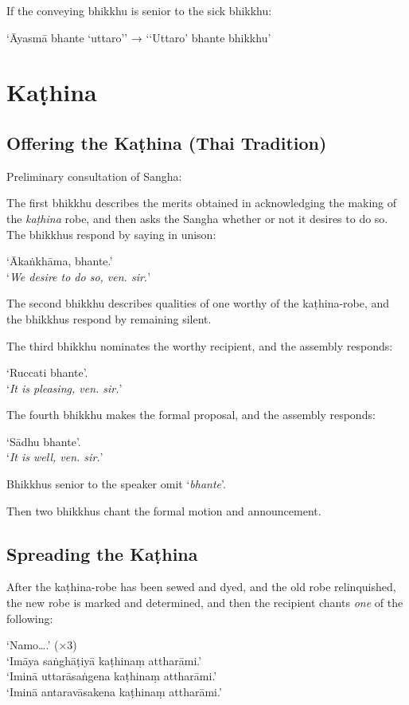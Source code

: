 If the conveying bhikkhu is senior to the sick bhikkhu:

‘Āyasmā bhante ‘uttaro’’ → ‘‘Uttaro’ bhante bhikkhu’


\section{Kaṭhina}

\subsection{Offering the Kaṭhina (Thai Tradition)}

Preliminary consultation of Sangha:

The first bhikkhu describes the merits obtained in acknowledging the making of
the \emph{kaṭhina} robe, and then asks the Sangha whether or not it desires to
do so. The bhikkhus respond by saying in unison:

‘Ākaṅkhāma, bhante.’\\
‘\emph{We desire to do so, ven. sir.}’

The second bhikkhu describes qualities of one worthy of the kaṭhina-robe, and
the bhikkhus respond by remaining silent.

The third bhikkhu nominates the worthy recipient, and the assembly responds:

‘Ruccati bhante’.\\
‘\emph{It is pleasing, ven. sir.}’

The fourth bhikkhu makes the formal proposal, and the assembly responds:

‘Sādhu bhante’.\\
‘\emph{It is well, ven. sir.}’

Bhikkhus senior to the speaker omit ‘\emph{bhante}’.

Then two bhikkhus chant the formal motion and announcement.


\subsection{Spreading the Kaṭhina}

After the kaṭhina-robe has been sewed and dyed, and the old robe relinquished,
the new robe is marked and determined, and then the recipient chants \emph{one}
of the following:

‘Namo….’ (×3)\\
‘Imāya saṅghāṭiyā kaṭhinaṃ attharāmi.’\\
‘Iminā uttarāsaṅgena kaṭhinaṃ attharāmi.’\\
‘Iminā antaravāsakena kaṭhinaṃ attharāmi.’

